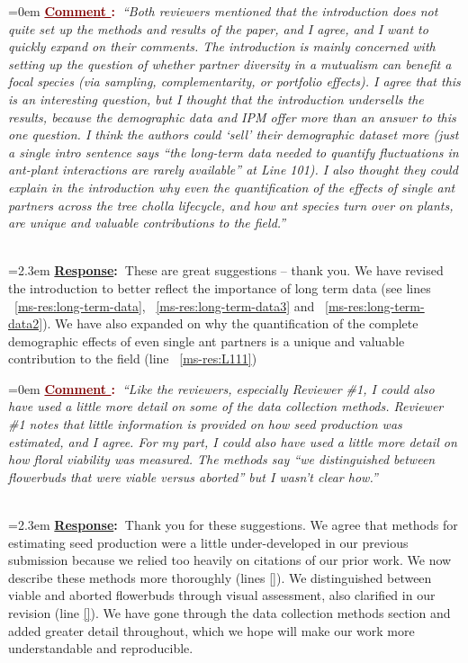 \documentclass[12pt]{article}
\newcounter{cN}
\newcommand{\comment}[1]{
	\vspace{2em}
	\refstepcounter{cN} %
	\noindent \hangindent=0em \textbf{\textcolor{Maroon}{\uline{Comment \thecN}:~}}\emph{``#1''}
	}
\newcommand{\response}[1]{
	\\[0.25em]
	\hangindent=2.3em \textbf{\textcolor{NavyBlue}{\uline{Response}:~}}#1
	}
\begin{document}
\comment{Both reviewers mentioned that the introduction does not quite set up the methods and results of the paper, and I agree, and I want to quickly expand on their comments. 
The introduction is mainly concerned with setting up the question of whether partner diversity in a mutualism can benefit a focal species (via sampling, complementarity, or portfolio effects). 
I agree that this is an interesting question, but I thought that the introduction undersells the results, because the demographic data and IPM offer more than an answer to this one question. 
I think the authors could ‘sell’ their demographic dataset more (just a single intro sentence says “the long-term data needed to quantify fluctuations in ant-plant interactions are rarely available” at Line 101). 
I also thought they could explain in the introduction why even the quantification of the effects of single ant partners across the tree cholla lifecycle, and how ant species turn over on plants, are unique and valuable contributions to the field.}
\response{These are great suggestions -- thank you. We have revised the introduction to better reflect the importance of long term data (see lines ~\ref{ms-res:long-term-data}, ~\ref{ms-res:long-term-data3} and ~\ref{ms-res:long-term-data2}). 
We have also expanded on why the quantification of the complete demographic effects of even single ant partners is a unique and valuable contribution to the field (line ~\ref{ms-res:L111})
}

\comment{Like the reviewers, especially Reviewer \#1, I could also have used a little more detail on some of the data collection methods. Reviewer \#1 notes that little information is provided on how seed production was estimated, and I agree. For my part, I could also have used a little more detail on how floral viability was measured. The methods say “we distinguished between flowerbuds that were viable versus aborted” but I wasn’t clear how.}
\response{Thank you for these suggestions. 
	We agree that methods for estimating seed production were a little under-developed in our previous submission because we relied too heavily on citations of our prior work. 
	We now describe these methods more thoroughly (lines \ref{}). 
	We distinguished between viable and aborted flowerbuds through visual assessment, also clarified in our revision (line \ref{}). 
	We have gone through the data collection methods section and added greater detail throughout, which we hope will make our work more understandable and reproducible.}
\end{document}
